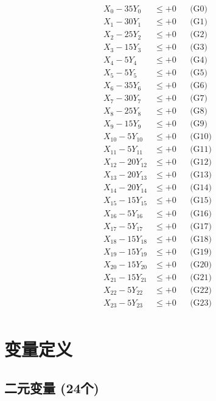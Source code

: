 \documentclass[a4paper,10pt]{article}
\begin{document}
\allowdisplaybreaks
{\small
\begin{align}
X_{0} - 35Y_{0} &\leq +0 && \text{(G0)} \\
X_{1} - 30Y_{1} &\leq +0 && \text{(G1)} \\
X_{2} - 25Y_{2} &\leq +0 && \text{(G2)} \\
X_{3} - 15Y_{3} &\leq +0 && \text{(G3)} \\
X_{4} - 5Y_{4} &\leq +0 && \text{(G4)} \\
X_{5} - 5Y_{5} &\leq +0 && \text{(G5)} \\
X_{6} - 35Y_{6} &\leq +0 && \text{(G6)} \\
X_{7} - 30Y_{7} &\leq +0 && \text{(G7)} \\
X_{8} - 25Y_{8} &\leq +0 && \text{(G8)} \\
X_{9} - 15Y_{9} &\leq +0 && \text{(G9)} \\
\allowbreak
X_{10} - 5Y_{10} &\leq +0 && \text{(G10)} \\
X_{11} - 5Y_{11} &\leq +0 && \text{(G11)} \\
X_{12} - 20Y_{12} &\leq +0 && \text{(G12)} \\
X_{13} - 20Y_{13} &\leq +0 && \text{(G13)} \\
X_{14} - 20Y_{14} &\leq +0 && \text{(G14)} \\
X_{15} - 15Y_{15} &\leq +0 && \text{(G15)} \\
X_{16} - 5Y_{16} &\leq +0 && \text{(G16)} \\
X_{17} - 5Y_{17} &\leq +0 && \text{(G17)} \\
X_{18} - 15Y_{18} &\leq +0 && \text{(G18)} \\
X_{19} - 15Y_{19} &\leq +0 && \text{(G19)} \\
\allowbreak
X_{20} - 15Y_{20} &\leq +0 && \text{(G20)} \\
X_{21} - 15Y_{21} &\leq +0 && \text{(G21)} \\
X_{22} - 5Y_{22} &\leq +0 && \text{(G22)} \\
X_{23} - 5Y_{23} &\leq +0 && \text{(G23)} \\
\end{align}
}

\section{变量定义}

\subsection{二元变量 (24个)}
\end{document}
